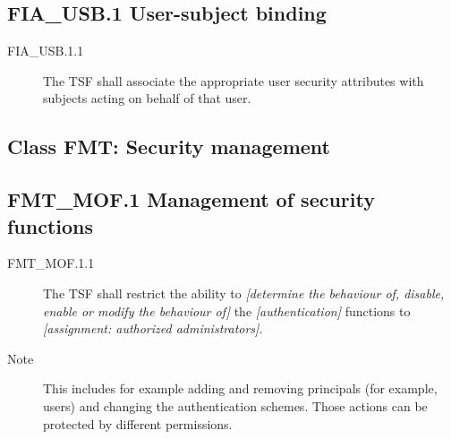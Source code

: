 \documentclass[12pt,english]{scrbook}
\begin{document}



\subsection{FIA{\_}USB.1 User-subject binding}
\begin{description}
\item[FIA{\_}USB.1.1]

The TSF shall associate the appropriate user security
attributes with subjects acting on behalf of that user.

\end{description}





\subsection{Class FMT: Security management}





\subsection{FMT{\_}MOF.1 Management of security functions}
\begin{description}
\item[FMT{\_}MOF.1.1]

The TSF shall restrict the ability to \emph{{[}determine the
behaviour of, disable, enable or modify the behaviour of]} the
\emph{{[}authentication]} functions to \emph{{[}assignment: 
authorized administrators]}.

\item[Note]

This includes for example adding and removing principals (for example,
users) and changing the authentication schemes. Those actions can be
protected by different permissions.

\end{description}
\end{document}
